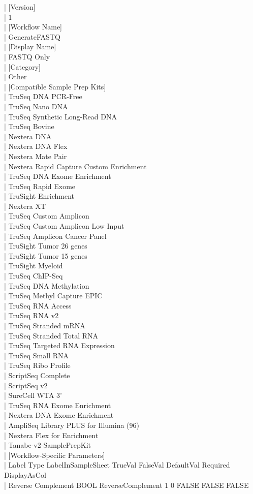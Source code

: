 \documentclass[titlepage,10pt,a4paper,uplatex]{jsbook}
\newenvironment{content}{\begin{shaded}\vspace{-1em}\raggedright\ttfamily\footnotesize\setlength{\baselineskip}{1.4em}}{\end{shaded}\vspace{-1em}}
\begin{document}
\begin{content}
| [Version]\\
| 1\\
| [Workflow Name]\\
| GenerateFASTQ\\
| [Display Name]\\
| FASTQ Only\\
| [Category]\\
| Other\\
| [Compatible Sample Prep Kits]\\
| TruSeq DNA PCR-Free\\
| TruSeq Nano DNA\\
| TruSeq Synthetic Long-Read DNA\\
| TruSeq Bovine\\
| Nextera DNA\\
| Nextera DNA Flex\\
| Nextera Mate Pair\\
| Nextera Rapid Capture Custom Enrichment\\
| TruSeq DNA Exome Enrichment\\
| TruSeq Rapid Exome\\
| TruSight Enrichment\\
| Nextera XT\\
| TruSeq Custom Amplicon\\
| TruSeq Custom Amplicon Low Input\\
| TruSeq Amplicon Cancer Panel\\
| TruSight Tumor 26 genes\\
| TruSight Tumor 15 genes\\
| TruSight Myeloid\\
| TruSeq ChIP-Seq\\
| TruSeq DNA Methylation\\
| TruSeq Methyl Capture EPIC\\
| TruSeq RNA Access\\
| TruSeq RNA v2\\
| TruSeq Stranded mRNA\\
| TruSeq Stranded Total RNA\\
| TruSeq Targeted RNA Expression\\
| TruSeq Small RNA\\
| TruSeq Ribo Profile\\
| ScriptSeq Complete\\
| ScriptSeq v2\\
| SureCell WTA 3'\\
| TruSeq RNA Exome Enrichment\\
| Nextera DNA Exome Enrichment\\
| AmpliSeq Library PLUS for Illumina (96)\\
| Nextera Flex for Enrichment\\
| Tanabe-v2-SamplePrepKit\\
| [Workflow-Specific Parameters]\\
| Label	Type	LabelInSampleSheet	TrueVal	FalseVal	DefaultVal	Required	DisplayAsCol\\
| Reverse Complement	BOOL	ReverseComplement	1	0	FALSE	FALSE	FALSE
\end{content}
\end{document}
